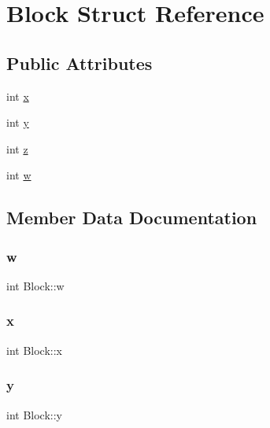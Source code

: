 \hypertarget{structBlock}{}\section{Block Struct Reference}
\label{structBlock}
\subsection*{Public Attributes}
\begin{DoxyCompactItemize}
\item 
int \hyperlink{structBlock_a13d0a6d225233353862fa5adcbadf661}{x}
\item 
int \hyperlink{structBlock_a9328d6b6fcc9f9c019d091d87ceda41c}{y}
\item 
int \hyperlink{structBlock_aeb6a2ee081d32a7c2e8f3ddcca235fc9}{z}
\item 
int \hyperlink{structBlock_aea0530a4c08ea5892151575b5301940e}{w}
\end{DoxyCompactItemize}


\subsection{Member Data Documentation}
\mbox{\label{structBlock_aea0530a4c08ea5892151575b5301940e}} 
\subsubsection{\texorpdfstring{w}{w}}
{\footnotesize\ttfamily int Block\+::w}

\mbox{\label{structBlock_a13d0a6d225233353862fa5adcbadf661}} 
\subsubsection{\texorpdfstring{x}{x}}
{\footnotesize\ttfamily int Block\+::x}

\mbox{\label{structBlock_a9328d6b6fcc9f9c019d091d87ceda41c}} 
\subsubsection{\texorpdfstring{y}{y}}
{\footnotesize\ttfamily int Block\+::y}

